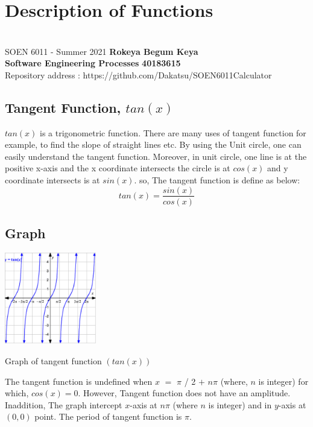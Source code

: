 \documentclass[a4paper, 11pt]{report}
\begin{document}
\section*{Description of Functions}
\section*{}
\normalsize {SOEN 6011 - Summer 2021} \hfill \textbf{Rokeya Begum Keya} \\
\textbf{ Software Engineering Processes}  \hfill \textbf{40183615} \\
\hfill Repository address : https://github.com/Dakatsu/SOEN6011Calculator
\\
 \subsection*{ Tangent Function, $tan(x)$ } 
 
 \normalsize{ \cite{test1} $tan(x)$ is a trigonometric function. There are many uses of tangent function for example, to find the slope of straight lines etc. By using the Unit circle, one can easily understand the tangent function. Moreover, in unit circle, one line is at the positive x-axis and the x coordinate intersects the circle is at $cos(x)$ and y coordinate intersects is at $sin(x)$. so, The tangent function is define as below: \[tan(x) = \frac{sin(x)}{cos(x)}\]
 }
 
 \subsection*{Graph}
 \begin{center}
\includegraphics[width= 4cm]{tan}
\end{center}
\begin{center}
Graph of tangent function $ (tan(x))$\end{center}
 \normalsize{ \cite{test1} The tangent function is undefined when $x$ $=$ $\pi$ / 2 $+$ $n \pi$ (where, $n$ is integer) for which, $cos(x) = 0$. However, Tangent function does not have an amplitude. Inaddition, The graph intercept $x$-axis at $n\pi$ (where $n$ is integer) and in $y$-axis at $(0,0)$ point. The period of tangent function is $\pi$.
 }
 \\
\end{document}
